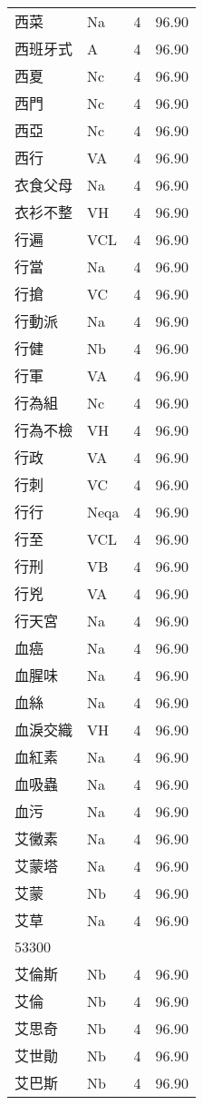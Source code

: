 \documentclass[twocolumn]{book}
\begin{document}
\begin{supertabular}{llrr}
西菜 & Na & 4 &  96.90\\
西班牙式 & A & 4 &  96.90\\
西夏 & Nc & 4 &  96.90\\
西門 & Nc & 4 &  96.90\\
西亞 & Nc & 4 &  96.90\\
西行 & VA & 4 &  96.90\\
衣食父母 & Na & 4 &  96.90\\
衣衫不整 & VH & 4 &  96.90\\
行遍 & VCL & 4 &  96.90\\
行當 & Na & 4 &  96.90\\
行搶 & VC & 4 &  96.90\\
行動派 & Na & 4 &  96.90\\
行健 & Nb & 4 &  96.90\\
行軍 & VA & 4 &  96.90\\
行為組 & Nc & 4 &  96.90\\
行為不檢 & VH & 4 &  96.90\\
行政 & VA & 4 &  96.90\\
行刺 & VC & 4 &  96.90\\
行行 & Neqa & 4 &  96.90\\
行至 & VCL & 4 &  96.90\\
行刑 & VB & 4 &  96.90\\
行兇 & VA & 4 &  96.90\\
行天宮 & Na & 4 &  96.90\\
血癌 & Na & 4 &  96.90\\
血腥味 & Na & 4 &  96.90\\
血絲 & Na & 4 &  96.90\\
血淚交織 & VH & 4 &  96.90\\
血紅素 & Na & 4 &  96.90\\
血吸蟲 & Na & 4 &  96.90\\
血污 & Na & 4 &  96.90\\
艾黴素 & Na & 4 &  96.90\\
艾蒙塔 & Na & 4 &  96.90\\
艾蒙 & Nb & 4 &  96.90\\
艾草 & Na & 4 &  96.90\\
53300\\
艾倫斯 & Nb & 4 &  96.90\\
艾倫 & Nb & 4 &  96.90\\
艾思奇 & Nb & 4 &  96.90\\
艾世勛 & Nb & 4 &  96.90\\
艾巴斯 & Nb & 4 &  96.90\\

\end{supertabular}
\end{document}
